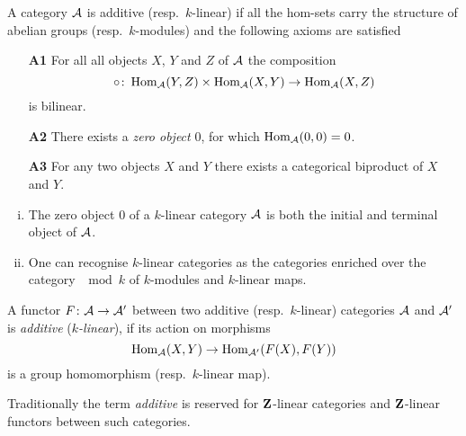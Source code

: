 \begin{definition}
    A category $\mathcal A$ is additive (resp.\ $k$-linear) 
    if all the hom-sets carry the structure of abelian groups (resp.\ $k$-modules) and the following axioms are satisfied
    \begin{enumerate}
        \item[\textbf{A1}] For all all objects $X$, $Y$ and $Z$ of $\mathcal A$ the composition
        \[
            \circ \colon \operatorname{Hom}_{\mathcal A}(Y, Z) \times \operatorname{Hom}_{\mathcal A}(X, Y) \to \operatorname{Hom}_{\mathcal A}(X, Z)
        \] 
        is bilinear.
        \item[\textbf{A2}] There exists a \emph{zero object} $0$, for which $\operatorname{Hom}_\mathcal A(0,0) = 0$.
        \item[\textbf{A3}] For any two objects $X$ and $Y$ there exists a categorical biproduct of $X$ and $Y$. 
    \end{enumerate} 
\end{definition}

\begin{remark}
    \begin{enumerate}[(i)]
        \item The zero object $0$ of a $k$-linear category $\mathcal A$ is both the initial and terminal object of $\mathcal A$.
        \item One can recognise $k$-linear categories as the categories enriched over the category $\mod{k}$ of $k$-modules and $k$-linear maps. 
    \end{enumerate}
\end{remark}


\begin{definition}
    A functor $F \colon \mathcal A \to \mathcal A'$ between two additive (resp.\ $k$-linear) categories $\mathcal A$ and $\mathcal A'$ is \emph{additive} (\resp \emph{$k$-linear}), if its action on morphisms
    \[
        \operatorname{Hom}_\mathcal A(X, Y) \to \operatorname{Hom}_{\mathcal A'}(F(X), F(Y))
    \] 
    is a group homomorphism (resp.\ $k$-linear map).
\end{definition}

Traditionally the term \emph{additive} is reserved for $\mathbf Z$-linear categories and $\mathbf Z$-linear functors between such categories.


